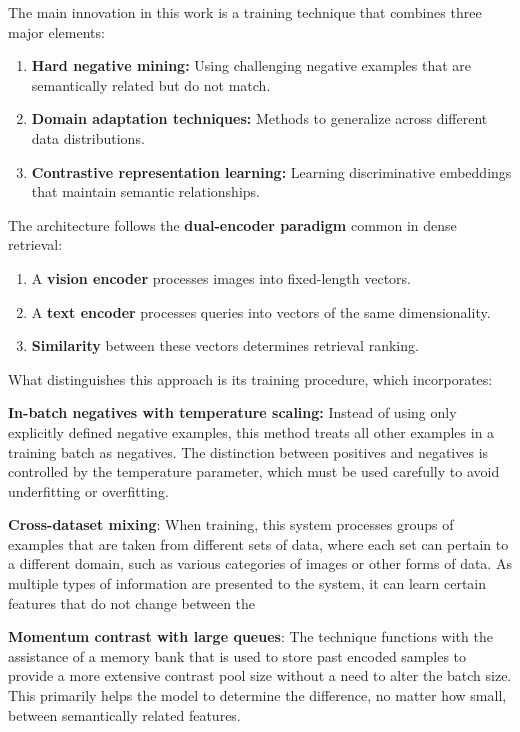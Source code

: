 \documentclass[conference]{IEEEtran}
\begin{document}
\begin{enumerate}
The main innovation in this work is a training technique that combines three major elements:
\begin{enumerate}
    \item \textbf{Hard negative mining:} Using challenging negative examples that are semantically related but do not match.
    \item \textbf{Domain adaptation techniques:} Methods to generalize across different data distributions.
    \item \textbf{Contrastive representation learning:} Learning discriminative embeddings that maintain semantic relationships.
\end{enumerate}

The architecture follows the \textbf{dual-encoder paradigm} common in dense retrieval:

\begin{enumerate}
    \item A \textbf{vision encoder} processes images into fixed-length vectors.
    \item A \textbf{text encoder} processes queries into vectors of the same dimensionality.
    \item \textbf{Similarity} between these vectors determines retrieval ranking.
\end{enumerate}

What distinguishes this approach is its training procedure, which incorporates:

\textbf{In-batch negatives with temperature scaling:} Instead of using only explicitly defined negative examples, this method treats all other examples in a training batch as negatives. The distinction between positives and negatives is controlled by the temperature parameter, which must be used carefully to avoid underfitting or overfitting.

\textbf{Cross-dataset mixing}: When training, this system processes groups of examples that are taken from different sets of data, where each set can pertain to a different domain, such as various categories of images or other forms of data. As multiple types of information are presented to the system, it can learn certain features that do not change between the

\textbf{Momentum contrast with large queues}: The technique functions with the assistance of a memory bank that is used to store past encoded samples to provide a more extensive contrast pool size without a need to alter the batch size. This primarily helps the model to determine the difference, no matter how small, between semantically related features.


\end{enumerate}
\end{document}
